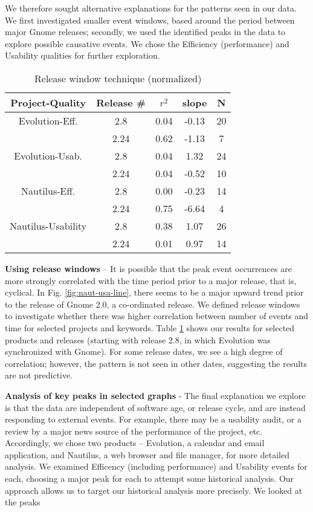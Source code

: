 \documentclass[conference, compsoc]{IEEEtran}
\begin{document}
We therefore sought alternative explanations for the patterns seen in our data. We first investigated smaller event windows, based around the period between major Gnome releases; secondly, we used the identified peaks in the data to explore possible causative events. We chose the Efficiency (performance) and Usability qualities for further exploration.

\begin{table}
	\caption{Release window technique (normalized)}
	\centering
	\label{tbl:windows}
\begin{tabular}{|c|c|c|c|c|}
\hline
\rowcolor[gray]{.9} 
Project-Quality & Release \# & $r^2$ & slope & N\\ \hline
Evolution-Eff. & 2.8 & 0.04 & -0.13 & 20 \\
 & 2.24 & 0.62 & -1.13 & 7\\ \hline
Evolution-Usab. & 2.8 & 0.04 & 1.32 & 24\\
 & 2.24 & 0.04 & -0.52 & 10 \\ \hline
Nautilus-Eff. & 2.8 & 0.00 & -0.23 & 14 \\
 & 2.24 & 0.75 & -6.64 & 4 \\ \hline
Nautilus-Usability & 2.8 & 0.38 & 1.07 & 26\\
 & 2.24 & 0.01 & 0.97 & 14\\
\hline
\end{tabular}
\end{table}

\noindent\textbf{Using release windows} -- It is possible that the peak event occurrences are more strongly correlated with the time period prior to a major release, that is, cyclical. In Fig. \ref{fig:naut-usa-line}, there seems to be a major upward trend prior to the release of Gnome 2.0, a co-ordinated release. We defined release windows to investigate whether there was higher correlation between number of events and time for selected projects and keywords. Table \ref{tbl:windows} shows our results for selected products and releases (starting with release 2.8, in which Evolution was synchronized with Gnome). For some release dates, we see a high degree of correlation; however, the pattern is not seen in other dates, suggesting the results are not predictive. 

\noindent\textbf{Analysis of key peaks in selected graphs} - The final explanation we explore is that the data are independent of software age, or release cycle, and are instead responding to external events. For example, there may be a usability audit, or a review by a major news source of the performance of the project, etc. Accordingly, we chose two products -- Evolution, a calendar and email application, and Nautilus, a web browser and file manager, for more detailed analysis. We examined Efficency (including performance) and Usability events for each, choosing a major peak for each to attempt some historical analysis. Our approach allows us to target our historical analysis more precisely. We looked at the peaks
\end{document}
